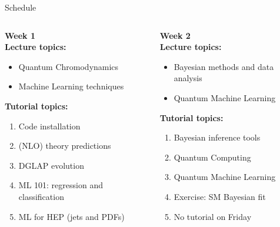 \documentclass[9pt,t]{beamer}
\begin{document}
\begin{frame}{Schedule}
  \begin{columns}
    \begin{column}{0.5\textwidth}
      \textbf{Week 1}\\[1em]
      \textbf{Lecture topics:}
      \begin{itemize}
        \item Quantum Chromodynamics
        \item Machine Learning techniques
      \end{itemize}
      \textbf{Tutorial topics:}
      \begin{enumerate}
        \item Code installation
        \item (NLO) theory predictions
        \item DGLAP evolution
        \item ML 101: regression and classification
        \item ML for HEP (jets and PDFs)
      \end{enumerate}
    \end{column}
    \begin{column}{0.5\textwidth}
      \textbf{Week 2}\\[1em]
      \textbf{Lecture topics:}
      \begin{itemize}
        \item Bayesian methods and data analysis
        \item Quantum Machine Learning
      \end{itemize}
      \textbf{Tutorial topics:}

      \begin{enumerate}
        \item Bayesian inference tools
        \item Quantum Computing
        \item Quantum Machine Learning
        \item Exercise: SM Bayesian fit
        \item No tutorial on Friday
      \end{enumerate}
    \end{column}
  \end{columns}
\end{frame}
\end{document}
